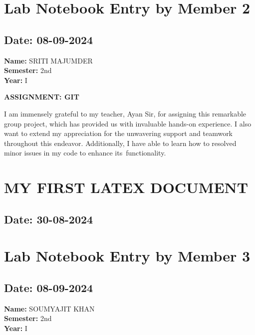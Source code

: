 \documentclass[12pt]{article}
\begin{document}
\section{Lab Notebook Entry by Member 2}
\subsection*{Date: 08-09-2024}

\begin{flushright}
\textbf{Name:} SRITI MAJUMDER \\
\textbf{Semester:} 2nd \\
\textbf{Year:} I \\
\end{flushright}

\begin{center}
\Huge \textbf{ASSIGNMENT: GIT}
\end{center}

I am immensely grateful to my teacher, Ayan Sir, for assigning this remarkable group project, which has provided us with invaluable hands-on experience. I also want to extend my appreciation for the unwavering support and teamwork throughout this endeavor. Additionally, I have able to learn how to  resolved minor issues in my  code to enhance its functionality.

\newpage
\section{MY FIRST LATEX DOCUMENT}
\subsection*{Date: 30-08-2024}
\newpage
\section{Lab Notebook Entry by Member 3}
\subsection*{Date: 08-09-2024}

\begin{flushright}
\textbf{Name:} SOUMYAJIT KHAN \\
\textbf{Semester:} 2nd \\
\textbf{Year:} I \\
\end{flushright}
\end{document}
